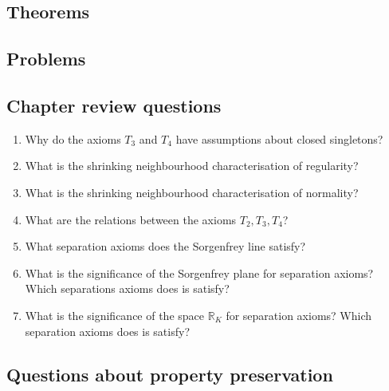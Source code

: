 \subsection{Theorems}

\subsection{Problems}

\subsection{Chapter review questions}

\begin{enumerate}
    \item Why do the axioms \( T_3 \) and \( T_4 \) have assumptions about closed singletons?

    \item What is the shrinking neighbourhood characterisation of regularity?

    \item What is the shrinking neighbourhood characterisation of normality?

    \item What are the relations between the axioms \( T_2, T_3, T_4 \)?

    \item What separation axioms does the Sorgenfrey line satisfy?

    \item What is the significance of the Sorgenfrey plane for separation axioms? Which separations axioms does is satisfy?

    \item What is the significance of the space \( \mathbb{R}_K \) for separation axioms? Which separation axioms does is satisfy?
\end{enumerate}

\subsection{Questions about property preservation}

